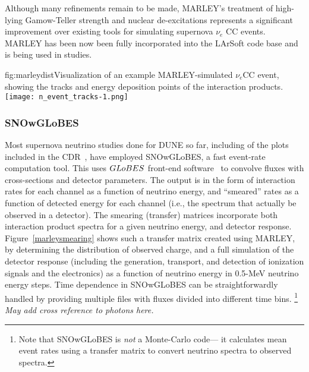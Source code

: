 Although many refinements remain to be made, MARLEY's treatment of high-lying
Gamow-Teller strength and nuclear de-excitations represents a significant
improvement over existing tools for simulating supernova $\nu_e$ CC events.  MARLEY has been now been fully incorporated into the LArSoft code base 
and is being used in studies.



\begin{dunefigure}{fig:marleydist}{Visualization of an
    example MARLEY-simulated $\nu_e$CC event, showing the tracks and energy
    deposition points of the interaction products. }
\texttt{[image: n\_event\_tracks-1.png]}
\end{dunefigure}


\subsubsection{SNOwGLoBES}\label{snowglobes}

Most supernova neutrino studies done for DUNE so far, including of the
plots included in the CDR~\cite{Acciarri:2015uup}, have employed
SNOwGLoBES\cite{snowglobes}, a fast event-rate computation tool.  This
uses $GLoBES$ front-end software~\cite{Huber:2004ka,globes} to
convolve fluxes with cross-sections and detector parameters.  The
output is in the form of interaction rates for each channel as a
function of neutrino energy, and ``smeared'' rates as a function of
detected energy for each channel (i.e., the spectrum that
actually be observed in a detector).  
The smearing (transfer) matrices incorporate both
interaction product spectra for a given neutrino energy, and detector
response.   Figure~\ref{marleysmearing} shows such a transfer matrix
created
using MARLEY, by determining the distribution of observed charge, and
 a full simulation of the detector response (including the generation,
 transport, and detection of ionization signals and the electronics)
 as a function of neutrino energy in 0.5-MeV neutrino energy steps.
Time dependence in SNOwGLoBES can be straightforwardly
handled by providing multiple files with fluxes divided into different
time bins. \footnote{Note that SNOwGLoBES is \textit{not} a Monte-Carlo
code--- it calculates mean event rates using a transfer matrix to
convert neutrino spectra to observed spectra.}
\textit{May add cross reference to photons here.}

